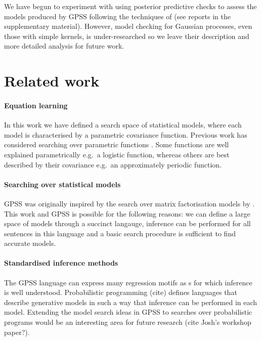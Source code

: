 \documentclass{article}
\def\eg{e.g.\ }
\begin{document}

We have begun to experiment with using posterior predictive checks to assess the models produced by GPSS following the techniques of \cite{Gelman1996} (see reports in the supplementary material).
However, model checking for Gaussian processes, even those with simple kernels, is under-researched so we leave their description and more detailed analysis for future work.

\section{Related work}

\paragraph{Equation learning}

In this work we have defined a search space of statistical models, where each model is characterised by a parametric covariance function.
Previous work has considered searching over parametric functions \citep[e.g.][]{Schmidt2009b}.
Some functions are well explained parametrically \eg a logistic function, whereas others are best described by their covariance \eg an approximately periodic function.

\paragraph{Searching over statistical models}

GPSS was originally inspired by the search over matrix factorisation models by \cite{grosse2012exploiting}.
This work and GPSS is possible for the following reasons: we can define a large space of models through a succinct langauge, inference can be performed for all sentences in this language and a basic search procedure is sufficient to find accurate models.

\paragraph{Standardised inference methods}
The GPSS language can express many regression motifs as \gp{}s for which inference is well understood.
Probabilistic programming (cite) defines languages that describe generative models in such a way that inference can be performed in each model.
Extending the model search ideas in GPSS to searches over probabilistic programs would be an interesting area for future research (cite Josh's workshop paper?).
\end{document}
